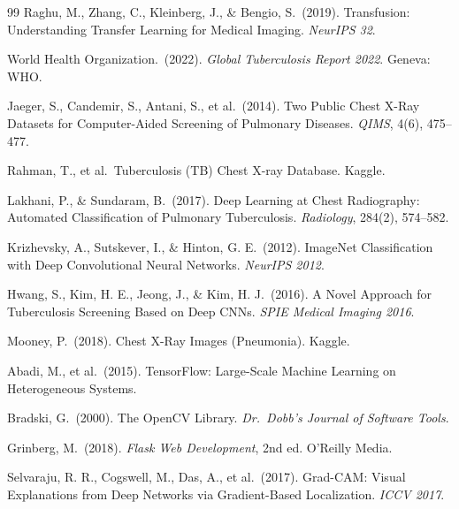 \begin{thebibliography}{99}
Raghu, M., Zhang, C., Kleinberg, J., \& Bengio, S.\ (2019).
Transfusion: Understanding Transfer Learning for Medical Imaging.
\textit{NeurIPS 32}.

World Health Organization.\ (2022).
\textit{Global Tuberculosis Report 2022}.
Geneva: WHO.

Jaeger, S., Candemir, S., Antani, S., et al.\ (2014).
Two Public Chest X-Ray Datasets for Computer-Aided Screening of Pulmonary Diseases.
\textit{QIMS}, 4(6), 475--477.

Rahman, T., et al.\ Tuberculosis (TB) Chest X-ray Database.
Kaggle.

Lakhani, P., \& Sundaram, B.\ (2017).
Deep Learning at Chest Radiography: Automated Classification of Pulmonary Tuberculosis.
\textit{Radiology}, 284(2), 574--582.

Krizhevsky, A., Sutskever, I., \& Hinton, G. E.\ (2012).
ImageNet Classification with Deep Convolutional Neural Networks.
\textit{NeurIPS 2012}.

Hwang, S., Kim, H. E., Jeong, J., \& Kim, H. J.\ (2016).
A Novel Approach for Tuberculosis Screening Based on Deep CNNs.
\textit{SPIE Medical Imaging 2016}.

Mooney, P.\ (2018).
Chest X-Ray Images (Pneumonia).
Kaggle.

Abadi, M., et al.\ (2015).
TensorFlow: Large-Scale Machine Learning on Heterogeneous Systems.

Bradski, G.\ (2000).
The OpenCV Library.
\textit{Dr.\ Dobb's Journal of Software Tools}.

Grinberg, M.\ (2018).
\textit{Flask Web Development}, 2nd ed.
O'Reilly Media.

Selvaraju, R. R., Cogswell, M., Das, A., et al.\ (2017).
Grad-CAM: Visual Explanations from Deep Networks via Gradient-Based Localization.
\textit{ICCV 2017}.

\end{thebibliography}

